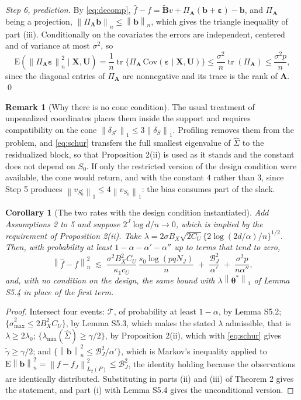 \documentclass[10pt]{book}
\newtheorem{corollary}{Corollary}[section]
\theoremstyle{definition}
\newtheorem{remark}{Remark}[section]
\newcommand{\E}{\mathrm{E}}
\newcommand{\norm}[1]{\left\lVert #1 \right\rVert}
\newcommand{\normn}[1]{\left\lVert #1 \right\rVert_{n}}
\newcommand{\NJ}{N_{J}}
\newcommand{\bX}{\mathbf{X}}
\newcommand{\bU}{\mathbf{U}}
\newcommand{\btheta}{\boldsymbol{\theta}}
\newcommand{\thetastar}{\btheta^{*}}
\newcommand{\Gramhat}{\widehat{\Sigma}}
\newcommand{\pen}{\lambda}
\newcommand{\Szero}{S_{0}}
\newcommand{\Amat}{\mathbf{A}}
\newcommand{\Bmat}{\mathbf{B}}
\newcommand{\Btil}{\widetilde{\Bmat}}
\newcommand{\PA}{\Pi_{\Amat}}
\newcommand{\bveps}{\boldsymbol{\varepsilon}}
\newcommand{\bb}{\mathbf{b}}
\newcommand{\smax}{\widehat{\sigma}_{\max}}
\newcommand{\gtil}{\widetilde{\gamma}}
\newcommand{\lmin}{\lambda_{\min}}
\DeclareMathOperator{\tr}{tr}
\begin{document}
\emph{Step 6, prediction.} By \eqref{eq:decomp},
$\widehat{f}-f = \Btil v + \PA(\bb+\bveps) - \bb$, and $\PA$ being a
projection, $\normn{\PA\bb} \le \normn{\bb}$, which gives the triangle
inequality of part (iii). Conditionally on the covariates the errors are
independent, centered and of variance at most $\sigma^2$, so
\[
  \E(\normn{\PA\bveps}^2\mid\bX,\bU)
  = \frac1n\tr\{\PA\,\mathrm{Cov}(\bveps\mid\bX,\bU)\}
  \le \frac{\sigma^2}{n}\tr(\PA) \le \frac{\sigma^2p}{n},
\]
since the diagonal entries of $\PA$ are nonnegative and its trace is the rank
of $\Amat$. \qed

\begin{remark}[Why there is no cone condition]
\label{rem:nocone}
The usual treatment of unpenalized coordinates \citep[Section
6.9]{buhlmann2011statistics} places them inside the support and requires
compatibility on the cone $\norm{\delta_{S^c}}_1 \le 3\norm{\delta_S}_1$.
Profiling removes them from the problem, and \eqref{eq:schur} transfers the
full smallest eigenvalue of $\Gramhat$ to the residualized block, so that
Proposition 2(ii) is used as it stands and the constant does not depend on
$\Szero$. If only the restricted version of the design condition were
available, the cone would return, and with the constant $4$ rather than $3$,
since Step 5 produces $\norm{v_{\Szero^c}}_1 \le 4\norm{v_{\Szero}}_1$: the
bias consumes part of the slack.
\end{remark}

\begin{corollary}[The two rates with the design condition instantiated]
\label{cor:instant}
Add Assumptions 2 to 5 and suppose $2^J\log d/n \to 0$, which is implied by
the requirement of Proposition 2(ii). Take
$\pen = 2\sigma B_X\sqrt{2C_U}\{2\log(2d/\alpha)/n\}^{1/2}$. Then, with
probability at least $1-\alpha-\alpha'-\alpha''$ up to terms that tend to
zero,
\[
  \normn{\widehat{f}-f}^2 \;\lesssim\;
  \frac{\sigma^2B_X^2C_U}{\kappa_1c_U}\,\frac{s_0\log(pq\NJ)}{n}
  \;+\; \frac{\mathcal{B}^2_J}{\alpha'} \;+\; \frac{\sigma^2p}{n\alpha''},
\]
and, with no condition on the design, the same bound with
$\pen\norm{\thetastar}_1$ of Lemma S5.4 in place of the first term.
\end{corollary}

\begin{proof}
Intersect four events: $\mathcal{T}$, of probability at least $1-\alpha$, by
Lemma S5.2; $\{\smax^2 \le 2B_X^2C_U\}$, by Lemma S5.3, which makes the stated
$\pen$ admissible, that is $\pen \ge 2\pen_0$;
$\{\lmin(\Gramhat)\ge\gamma/2\}$, by Proposition 2(ii), which with
\eqref{eq:schur} gives $\gtil \ge \gamma/2$; and
$\{\normn{\bb}^2 \le \mathcal{B}_J^2/\alpha'\}$, which is Markov's inequality
applied to $\E\normn{\bb}^2 = \norm{f-f_J}^2_{L_2(P)} \le \mathcal{B}_J^2$,
the identity holding because the observations are identically distributed.
Substituting in parts (ii) and (iii) of Theorem 2 gives the statement, and
part (i) with Lemma S5.4 gives the unconditional version.
\end{proof}
\end{document}
